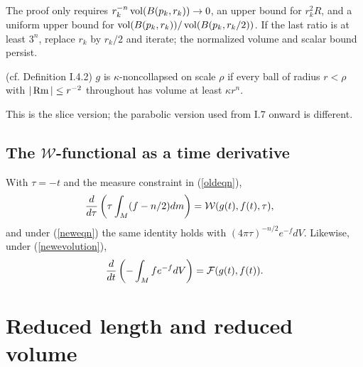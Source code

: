 \begin{remark}
  \label{rem:kl-no-local-collapsing-theorem-i-estimates-scalar-curvature}
The proof only requires $r_k^{-n}\operatorname{vol}(B(p_k,r_k))\to0$, an upper bound for
$r_k^2R$, and a uniform upper bound for
$\operatorname{vol}(B(p_k,r_k))/\operatorname{vol}(B(p_k,r_k/2))$. If the last ratio is at least $3^n$,
replace $r_k$ by $r_k/2$ and iterate; the normalized volume and scalar bound persist.
\end{remark}
\begin{definition}
  \label{def:kl-no-local-collapsing-theorem-i-kappa-noncollapsing}
  \label{noncollapsed1} (cf. Definition I.4.2)
$g$ is $\kappa$-noncollapsed on scale $\rho$ if every ball of radius $r<\rho$
with $|\operatorname{Rm}|\le r^{-2}$ throughout has volume at least $\kappa r^n$.
\end{definition}
\begin{remark}
  \label{rem:kl-no-local-collapsing-theorem-i-structural-remark-noncollapsing}
This is the slice version; the parabolic version used from I.7 onward is different.
\end{remark}

\subsection{The ${\mathcal W}$-functional as a time derivative} \label{I.5}
With $\tau=-t$ and the measure constraint in (\ref{oldeqn}),
\begin{align}
{d\over d\tau}\left(\tau\int_M(f-n/2)dm\right)&={\mathcal W}(g(t),f(t),\tau),
\end{align}
and under (\ref{neweqn}) the same identity holds with
$(4\pi\tau)^{-n/2}e^{-f}dV$. Likewise, under (\ref{newevolution}),
\begin{equation}
{d\over dt}\left(-\int_Mfe^{-f}dV\right)={\mathcal F}(g(t),f(t)).
\end{equation}

\section{Reduced length and reduced volume} \label{I.7}

